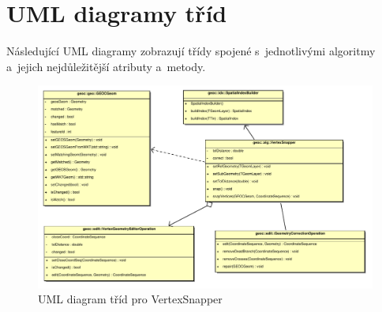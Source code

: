 \normalsize

\chapter{UML diagramy tříd}
\label{priloha-diagramy}

Následující UML diagramy zobrazují třídy spojené s~jednotlivými 
algoritmy a~jejich nejdůležitější atributy a~metody.

  \begin{figure}[hbt]
    \centering
      \includegraphics[width=420pt]{./pictures/uml-vs.pdf}
      \caption{UML diagram tříd pro VertexSnapper}
      \label{fig:uml-vs}
  \end{figure}

